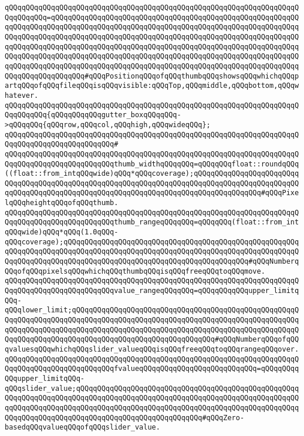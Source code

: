 \verb|qQQqqQQqqQQqqQQqqQQqqQQqqQQqqQQqqQQqqQQqqQQqqQQqqQQqqQQqqQQqqQQqqQQqqQQqqQQqqQQq=qQQqqQQqqQQqqQQqqQQqqQQqqQQqqQQqqQQqqQQqqQQqqQQqqQQqqQQqqQQqqQQqqQQqqQQqqQQqqQQqqQQqqQQqqQQqqQQqqQQqqQQqqQQqqQQqqQQqqQQqqQQqqQQqqQQqqQQqqQQqqQQqqQQqqQQqqQQqqQQqqQQqqQQqqQQqqQQqqQQqqQQqqQQqqQQqqQQqqQQqqQQqqQQqqQQqqQQqqQQqqQQqqQQqqQQqqQQqqQQqqQQqqQQqqQQqqQQqqQQqqQQqqQQqqQQqqQQqqQQqqQQqqQQqqQQqqQQqqQQqqQQqqQQqqQQqqQQqqQQqqQQqqQQqqQQqqQQqqQQqqQQqqQQqqQQqqQQqqQQqqQQqqQQqqQQqqQQqqQQqqQQqqQQqqQQqqQQqqQQqqQQqqQQqqQQqqQQqqQQqqQQqqQQq#qQQqPositionqQQqofqQQqthumbqQQqshowsqQQqwhichqQQqpartqQQqofqQQqfileqQQqisqQQqvisible:qQQqTop,qQQqmiddle,qQQqbottom,qQQqwhatever.|\newline
\verb|qQQqqQQqqQQqqQQqqQQqqQQqqQQqqQQqqQQqqQQqqQQqqQQqqQQqqQQqqQQqqQQqqQQqqQQqqQQqqQQq{qQQqqQQqqQQqgutter_boxqQQqqQQq->qQQqqQQq{qQQqrow,qQQqcol,qQQqhigh,qQQqwideqQQq};|\newline
\verb|qQQqqQQqqQQqqQQqqQQqqQQqqQQqqQQqqQQqqQQqqQQqqQQqqQQqqQQqqQQqqQQqqQQqqQQqqQQqqQQqqQQqqQQqqQQqqQQq#|\newline
\verb|qQQqqQQqqQQqqQQqqQQqqQQqqQQqqQQqqQQqqQQqqQQqqQQqqQQqqQQqqQQqqQQqqQQqqQQqqQQqqQQqqQQqqQQqqQQqqQQqthumb_widthqQQqqQQq=qQQqqQQqfloat::roundqQQq((float::from_intqQQqwide)qQQq*qQQqcoverage);qQQqqQQqqQQqqQQqqQQqqQQqqQQqqQQqqQQqqQQqqQQqqQQqqQQqqQQqqQQqqQQqqQQqqQQqqQQqqQQqqQQqqQQqqQQqqQQqqQQqqQQqqQQqqQQqqQQqqQQqqQQqqQQqqQQqqQQqqQQqqQQqqQQqqQQqqQQq#qQQqPixelqQQqheightqQQqofqQQqthumb.|\newline
\verb|qQQqqQQqqQQqqQQqqQQqqQQqqQQqqQQqqQQqqQQqqQQqqQQqqQQqqQQqqQQqqQQqqQQqqQQqqQQqqQQqqQQqqQQqqQQqqQQqthumb_rangeqQQqqQQq=qQQqqQQq(float::from_intqQQqwide)qQQq*qQQq(1.0qQQq-qQQqcoverage);qQQqqQQqqQQqqQQqqQQqqQQqqQQqqQQqqQQqqQQqqQQqqQQqqQQqqQQqqQQqqQQqqQQqqQQqqQQqqQQqqQQqqQQqqQQqqQQqqQQqqQQqqQQqqQQqqQQqqQQqqQQqqQQqqQQqqQQqqQQqqQQqqQQqqQQqqQQqqQQqqQQqqQQqqQQqqQQqqQQqqQQq#qQQqNumberqQQqofqQQqpixelsqQQqwhichqQQqthumbqQQqisqQQqfreeqQQqtoqQQqmove.|\newline
\verb|qQQqqQQqqQQqqQQqqQQqqQQqqQQqqQQqqQQqqQQqqQQqqQQqqQQqqQQqqQQqqQQqqQQqqQQqqQQqqQQqqQQqqQQqqQQqqQQqvalue_rangeqQQqqQQq=qQQqqQQqqQQqupper_limitqQQq-qQQqlower_limit;qQQqqQQqqQQqqQQqqQQqqQQqqQQqqQQqqQQqqQQqqQQqqQQqqQQqqQQqqQQqqQQqqQQqqQQqqQQqqQQqqQQqqQQqqQQqqQQqqQQqqQQqqQQqqQQqqQQqqQQqqQQqqQQqqQQqqQQqqQQqqQQqqQQqqQQqqQQqqQQqqQQqqQQqqQQqqQQqqQQqqQQqqQQqqQQqqQQqqQQqqQQqqQQqqQQqqQQqqQQqqQQqqQQqqQQqqQQqqQQqqQQq#qQQqNumberqQQqofqQQqvaluesqQQqwhichqQQqslider_valueqQQqisqQQqfreeqQQqtoqQQqrangeqQQqover.|\newline
\verb|qQQqqQQqqQQqqQQqqQQqqQQqqQQqqQQqqQQqqQQqqQQqqQQqqQQqqQQqqQQqqQQqqQQqqQQqqQQqqQQqqQQqqQQqqQQqqQQqfvalueqQQqqQQqqQQqqQQqqQQqqQQqqQQq=qQQqqQQqqQQqupper_limitqQQq-qQQqslider_value;qQQqqQQqqQQqqQQqqQQqqQQqqQQqqQQqqQQqqQQqqQQqqQQqqQQqqQQqqQQqqQQqqQQqqQQqqQQqqQQqqQQqqQQqqQQqqQQqqQQqqQQqqQQqqQQqqQQqqQQqqQQqqQQqqQQqqQQqqQQqqQQqqQQqqQQqqQQqqQQqqQQqqQQqqQQqqQQqqQQqqQQqqQQqqQQqqQQqqQQqqQQqqQQqqQQqqQQqqQQqqQQqqQQqqQQqqQQqqQQq#qQQqZero-basedqQQqvalueqQQqofqQQqslider_value.|\newline
